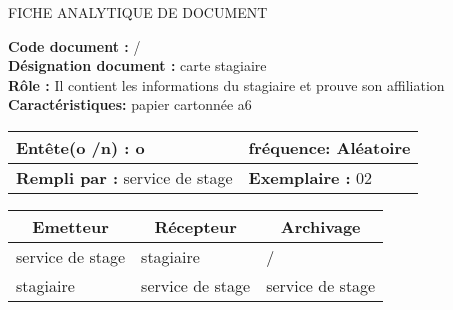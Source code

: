 

\newpage

\begin{center}
\Huge FICHE ANALYTIQUE DE DOCUMENT
\end{center}

\vspace{0.5cm}
    

\begin{flushleft}
\textbf{Code document :} / \\
\textbf{Désignation document :} carte stagiaire \\
\textbf{Rôle :} Il contient les informations du stagiaire et prouve son affiliation \\
\textbf{Caractéristiques:} papier cartonnée a6 \\
\end{flushleft}

\vspace{1cm}

\begin{table}[ht]
\begin{tabularx}{\textwidth}{|X|X|}

\hline
\textbf{Entête(o /n) :}  o   & \textbf{fréquence:} Aléatoire  \\
\hline
\textbf{Rempli par :}  service de stage    & \textbf{Exemplaire :} 02  \\
\hline
\end{tabularx}
\end{table}

\vspace{1cm}

\begin{table}[ht]
\begin{tabularx}{\textwidth}{|X|X|X|}
  \hline
  \multicolumn{1}{|c|}{\centering\textbf{Emetteur}} & \multicolumn{1}{c|}{\centering\textbf{Récepteur}} & \multicolumn{1}{c|}{\centering\textbf{Archivage}} \\
  \hline
  service de stage & stagiaire & / \\
  \hline
  stagiaire & service de stage & service de stage \\
  \hline
\end{tabularx}
\end{table}

\vspace{1cm}

